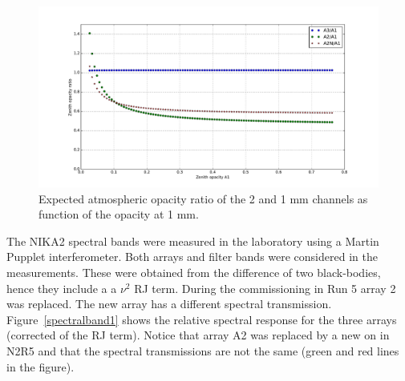 \begin{figure}[ht] %
\begin{center}
\includegraphics[width=\textwidth]{Figures/SpectralBands/opacity_ratio_vs_tau1.pdf}
\caption{Expected atmospheric opacity ratio of the 2 and 1 mm channels as function of the opacity at 1 mm. \label{thopacities}}
\end{center}
\end{figure}



The NIKA2 spectral bands were measured in the laboratory using a Martin Pupplet interferometer.
Both arrays and filter bands were considered in the
measurements. These were obtained from the difference of two
black-bodies, hence they include a a $\nu^2$ RJ term. During the
commissioning in Run 5 array 2 was replaced. The new array has a
different spectral transmission. Figure~\ref{spectralband1} shows the
relative spectral response for the three arrays (corrected of the RJ
term). Notice that array A2 was replaced by a new on in N2R5 and that
the spectral transmissions are not the same (green and red lines in the
figure). 



